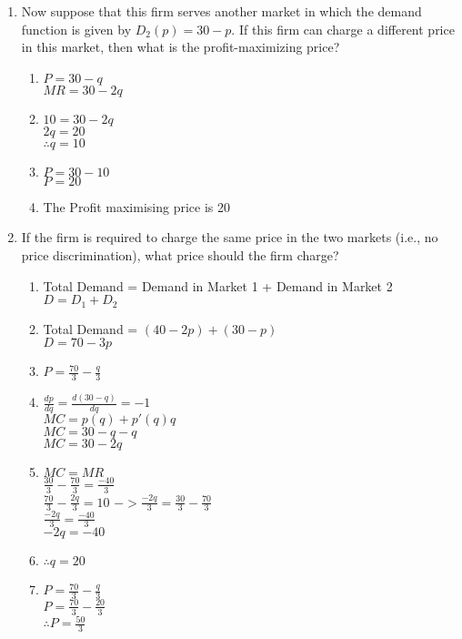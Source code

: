 \documentclass[11pt]{article}
\begin{document}
\begin{enumerate}
\begin{enumerate}
	\item Now suppose that this firm serves another market in which the demand function is given by $D_{2}(p)=30-p$. If this firm can charge a different price in this market, then what is the profit-maximizing price?
	\begin{enumerate}
        \item $P = 30 - q$\\
        $MR = 30-2q$
        \item $10 = 30 - 2q$\\
        $2q = 20$\\
        $\therefore q = 10$
        \item $P = 30 - 10$\\
        $P = 20$
        \item The Profit maximising price is 20
    \end{enumerate}
	

	\item If the firm is required to charge the same price in the two markets (i.e., no price discrimination), what price should the firm charge?
	\begin{enumerate}
        \item Total Demand = Demand in Market 1 + Demand in Market 2\\
        $D = D_1 + D_2$
        \item Total Demand = $(40 - 2p) + (30 - p)$\\
        $D = 70 - 3p$
        \item $P = \frac{70}{3} - \frac{q}{3}$
        \item $\frac{dp}{dq} = \frac{d(30-q)}{dq} = -1$\\
        $MC = p(q) + p'(q)q$\\
        $MC = 30-q-q$\\
        $MC = 30-2q$
        \item $MC = MR$\\
        $\frac{30}{3} - \frac{70}{3} = \frac{-40}{3}$\\
        $\frac{70}{3} - \frac{2q}{3} = 10$ $-> \frac{-2q}{3} = \frac{30}{3} - \frac{70}{3}$\\
        $\frac{-2q}{3} = \frac{-40}{3}$\\
        $-2q = -40$
        \item $\therefore q = 20$
        \item $P = \frac{70}{3} - \frac{q}{3}$\\
        $P = \frac{70}{3} - \frac{20}{3}$\\
        $\therefore P = \frac{50}{3}$
    \end{enumerate}
	

\end{enumerate}
\end{enumerate}
\end{document}
